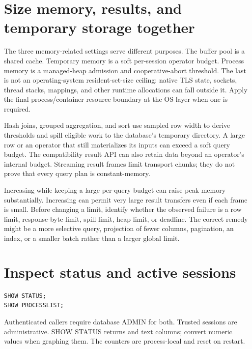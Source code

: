 \section{Size memory, results, and temporary storage together}

The three memory-related settings serve different purposes. The buffer pool
is a shared cache. Temporary memory is a soft per-session operator budget.
Process memory is a managed-heap admission and cooperative-abort threshold.
The last is not an operating-system resident-set-size ceiling: native TLS
state, sockets, thread stacks, mappings, and other runtime allocations can
fall outside it. Apply the final process/container resource boundary at the
OS layer when one is required.

Hash joins, grouped aggregation, and sort use sampled row width to derive
thresholds and spill eligible work to the database's temporary directory.
A large row or an operator that still materializes its inputs can exceed a
soft query budget. The compatibility result API can also retain data beyond
an operator's internal budget. Streaming result frames limit transport chunks;
they do not prove that every query plan is constant-memory.

Increasing  while keeping a large per-query budget can
raise peak memory substantially. Increasing  can permit
very large result transfers even if each frame is small. Before changing a
limit, identify whether the observed failure is a row limit, response-byte
limit, spill limit, heap limit, or deadline. The correct remedy might be a
more selective query, projection of fewer columns, pagination, an index, or a
smaller batch rather than a larger global limit.

\section{Inspect status and active sessions}

\begin{lstlisting}[language=SQL]
SHOW STATUS;
SHOW PROCESSLIST;
\end{lstlisting}

Authenticated callers require database ADMIN for both. Trusted sessions are
administrative. SHOW STATUS returns  and
 text columns; convert numeric values when graphing them. The
counters are process-local and reset on restart.

